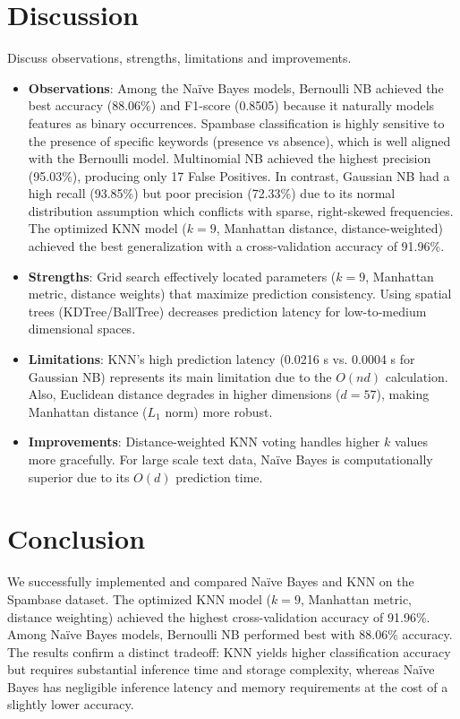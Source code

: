 \documentclass[12pt,a4paper]{article}
\begin{document}
\section{Discussion}
Discuss observations, strengths, limitations and improvements.
\begin{itemize}
\item \textbf{Observations}: Among the Na\"ive Bayes models, Bernoulli NB achieved the best accuracy (88.06\%) and F1-score (0.8505) because it naturally models features as binary occurrences. Spambase classification is highly sensitive to the presence of specific keywords (presence vs absence), which is well aligned with the Bernoulli model. Multinomial NB achieved the highest precision (95.03\%), producing only 17 False Positives. In contrast, Gaussian NB had a high recall (93.85\%) but poor precision (72.33\%) due to its normal distribution assumption which conflicts with sparse, right-skewed frequencies. The optimized KNN model  ($k=9$, Manhattan distance, distance-weighted)  achieved the best generalization with a cross-validation accuracy of 91.96\%.
\item \textbf{Strengths}: Grid search effectively located parameters ($k=9$, Manhattan metric, distance weights) that maximize prediction consistency. Using spatial trees (KDTree/BallTree) decreases prediction latency for low-to-medium dimensional spaces.
\item \textbf{Limitations}: KNN's high prediction latency (0.0216 s vs. 0.0004 s for Gaussian NB) represents its main limitation due to the $O(nd)$ calculation. Also, Euclidean distance degrades in higher dimensions ($d=57$), making Manhattan distance ($L_1$ norm) more robust.
\item \textbf{Improvements}: Distance-weighted KNN voting handles higher $k$ values more gracefully. For large scale text data, Na\"ive Bayes is computationally superior due to its $O(d)$ prediction time.
\end{itemize}

\section{Conclusion}
We successfully implemented and compared Na\"ive Bayes and KNN on the Spambase dataset. The optimized KNN model ($k=9$, Manhattan metric, distance weighting) achieved the highest cross-validation accuracy of 91.96\%. Among Na\"ive Bayes models, Bernoulli NB performed best with 88.06\% accuracy. The results confirm a distinct tradeoff: KNN yields higher classification accuracy but requires substantial inference time and storage complexity, whereas Na\"ive Bayes has negligible inference latency and memory requirements at the cost of a slightly lower accuracy.
\end{document}
